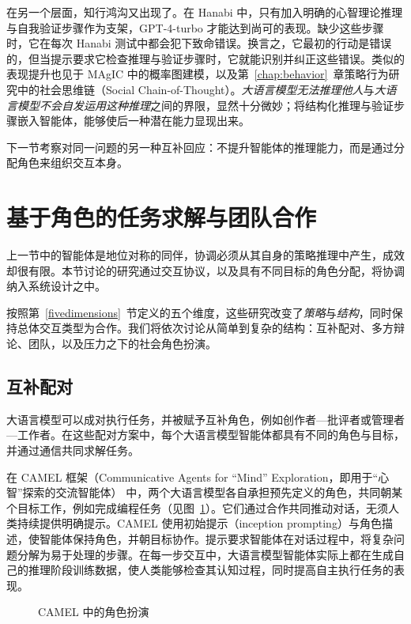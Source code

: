 在另一个层面，知行鸿沟又出现了。在 Hanabi 中，只有加入明确的心智理论推理与自我验证步骤作为支架，GPT-4-turbo 才能达到尚可的表现。缺少这些步骤时，它在每次 Hanabi 测试中都会犯下致命错误。换言之，它最初的行动是错误的，但当提示要求它检查推理与验证步骤时，它就能识别并纠正这些错误。类似的表现提升也见于 MAgIC 中的概率图建模，以及第~\ref{chap:behavior}~章策略行为研究中的社会思维链（Social Chain-of-Thought）。\emph{大语言模型无法推理他人}与\emph{大语言模型不会自发运用这种推理}之间的界限，显然十分微妙；将结构化推理与验证步骤嵌入智能体，能够使后一种潜在能力显现出来。

下一节考察对同一问题的另一种互补回应：不提升智能体的推理能力，而是通过分配角色来组织交互本身。

\section{基于角色的任务求解与团队合作}\label{sec:roletask}
上一节中的智能体是地位对称的同伴，协调必须从其自身的策略推理中产生，成效却很有限。本节讨论的研究通过交互协议，以及具有不同目标的角色分配，将协调纳入系统设计之中。

按照第~\ref{fivedimensions}~节定义的五个维度，这些研究改变了\emph{策略}与\emph{结构}，同时保持总体交互类型为合作。我们将依次讨论从简单到复杂的结构：互补配对、多方辩论、团队，以及压力之下的社会角色扮演。

\subsection{互补配对}
大语言模型可以成对执行任务，并被赋予互补角色，例如创作者—批评者或管理者—工作者。在这些配对方案中，每个大语言模型智能体都具有不同的角色与目标，并通过通信共同求解任务。

在 CAMEL 框架（Communicative Agents for ``Mind'' Exploration，即用于“心智”探索的交流智能体）\citep{li2023camel} 中，两个大语言模型各自承担预先定义的角色，共同朝某个目标工作，例如完成编程任务（见图~\ref{fig:camel}）。它们通过合作共同推动对话，无须人类持续提供明确提示。CAMEL 使用初始提示（inception prompting）与角色描述，使智能体保持角色，并朝目标协作。提示要求智能体在对话过程中，将复杂问题分解为易于处理的步骤。在每一步交互中，大语言模型智能体实际上都在生成自己的推理阶段训练数据，使人类能够检查其认知过程，同时提高自主执行任务的表现。

\begin{figure}[!htb]
  \begin{center}
    
    \caption{CAMEL 中的角色扮演 \citep{li2023camel}}\label{fig:camel}
  \end{center}
\end{figure}


